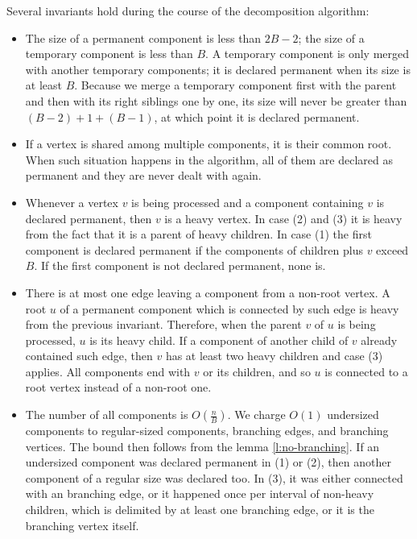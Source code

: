 Several invariants hold during the course of the decomposition algorithm:
\begin{itemize}
	\item The size of a permanent component is less than $2 B - 2$; the size of a temporary component is less than $B$.
	A temporary component is only merged with another temporary components; it is declared permanent when its size is at least $B$.
	Because we merge a temporary component first with the parent and then with its right siblings one by one, its size will never be greater than $(B - 2) + 1 + (B - 1)$, at which point it is declared permanent.
	
	\item If a vertex is shared among multiple components, it is their common root.
	When such situation happens in the algorithm, all of them are declared as permanent and they are never dealt with again.
	
	\item Whenever a vertex $v$ is being processed and a component containing $v$ is declared permanent, then $v$ is a heavy vertex.
	In case (2) and (3) it is heavy from the fact that it is a parent of heavy children.
	In case (1) the first component is declared permanent if the components of children plus $v$ exceed $B$.
	If the first component is not declared permanent, none is.
	
	\item There is at most one edge leaving a component from a non-root vertex.
	A root $u$ of a permanent component which is connected by such edge is heavy from the previous invariant.
	Therefore, when the parent $v$ of $u$ is being processed, $u$ is its heavy child.
	If a component of another child of $v$ already contained such edge, then $v$ has at least two heavy children and case (3) applies.
	All components end with $v$ or its children, and so $u$ is connected to a root vertex instead of a non-root one.
	
	\item The number of all components is $O\left(\frac{n}{B}\right)$.
	We charge $O(1)$ undersized components to regular-sized components, branching edges, and branching vertices.
	The bound then follows from the lemma \ref{l:no-branching}.
	If an undersized component was declared permanent in (1) or (2), then another component of a regular size was declared too.
	In (3), it was either connected with an branching edge, or it happened once per interval of non-heavy children, which is delimited by at least one branching edge, or it is the branching vertex itself.
\end{itemize}

